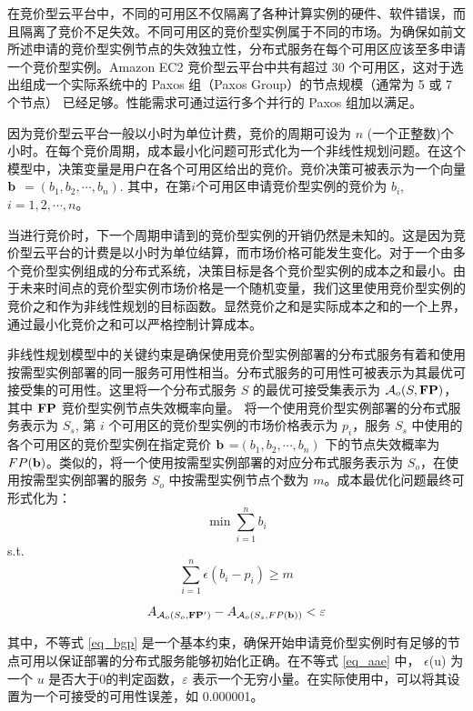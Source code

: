 在竞价型云平台中，不同的可用区不仅隔离了各种计算实例的硬件、软件错误，而且隔离了竞价不足失效。不同可用区的竞价型实例属于不同的市场。为确保如前文所述申请的竞价型实例节点的失效独立性，分布式服务在每个可用区应该至多申请一个竞价型实例。Amazon EC2 竞价型云平台中共有超过 30 个可用区，这对于选出组成一个实际系统中的 Paxos 组（Paxos Group）的节点规模（通常为 5 或 7 个节点）\cite{Burrows:2006:CLS:1298455.1298487} 已经足够。性能需求可通过运行多个并行的 Paxos 组加以满足。

因为竞价型云平台一般以小时为单位计费，竞价的周期可设为 $n$ (一个正整数)个小时。在每个竞价周期，成本最小化问题可形式化为一个非线性规划问题。在这个模型中，决策变量是用户在各个可用区给出的竞价。竞价决策可被表示为一个向量 $\bf b$ $= (b_1, b_2, \cdots, b_n)$. 其中，在第$i$个可用区申请竞价型实例的竞价为 $b_i$, $i = 1, 2, \cdots, n$。

当进行竞价时，下一个周期申请到的竞价型实例的开销仍然是未知的。这是因为竞价型云平台的计费是以小时为单位结算，而市场价格可能发生变化。对于一个由多个竞价型实例组成的分布式系统，决策目标是各个竞价型实例的成本之和最小。由于未来时间点的竞价型实例市场价格是一个随机变量，我们这里使用竞价型实例的竞价之和作为非线性规划的目标函数。显然竞价之和是实际成本之和的一个上界，通过最小化竞价之和可以严格控制计算成本。

非线性规划模型中的关键约束是确保使用竞价型实例部署的分布式服务有着和使用按需型实例部署的同一服务可用性相当。分布式服务的可用性可被表示为其最优可接受集的可用性。这里将一个分布式服务 $S$ 的最优可接受集表示为 $\mathcal{A}_{o}(S, \bf{FP})$，其中 $\bf{FP}$ 竞价型实例节点失效概率向量。 将一个使用竞价型实例部署的分布式服务表示为 $S_s$, 第 $i$ 个可用区的竞价型实例的市场价格表示为 $p_i$，服务 $S_s$ 中使用的各个可用区的竞价型实例在指定竞价 $\bf b$ =$ (b_1, b_2, \cdots, b_n)$ 下的节点失效概率为 $FP(\bf b)$。类似的，将一个使用按需型实例部署的对应分布式服务表示为 $S_o$，在使用按需型实例部署的服务 $S_o$ 中按需型实例节点个数为 $m$。成本最优化问题最终可形式化为：
\begin{equation}
\min \sum_{i=1}^n b_i
\end{equation}
s.t.
\begin{equation}\label{eq_bgp}
\sum_{i=1}^n {\epsilon(b_i - p_i)} \geq m
\end{equation}

\begin{equation}\label{eq_aae}
A_{\mathcal{A}_{o}(S_o, {\bf{FP^{\prime}}})} - A_{\mathcal{A}_{o}(S_s, FP(\bf b))} < \varepsilon
\end{equation}

其中，不等式 \eqref{eq_bgp} 是一个基本约束，确保开始申请竞价型实例时有足够的节点可用以保证部署的分布式服务能够初始化正确。在不等式 \eqref{eq_aae} 中， $\epsilon$(u) 为一个 $u$ 是否大于0的判定函数，$\varepsilon$ 表示一个无穷小量。在实际使用中，可以将其设置为一个可接受的可用性误差，如 0.000001。

